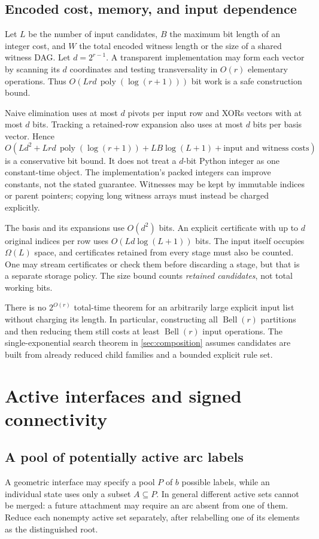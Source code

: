 \documentclass[11pt,a4paper]{article}
\theoremstyle{definition}
\theoremstyle{remark}
\newcommand{\Bell}{\operatorname{Bell}}
\newcommand{\poly}{\operatorname{poly}}
\begin{document}
\subsection{Encoded cost, memory, and input dependence}\label{sub:cost}
Let $L$ be the number of input candidates, $B$ the maximum bit length of an integer
cost, and $W$ the total encoded witness length or the size of a shared witness DAG.
Let $d=2^{r-1}$. A transparent implementation may form each vector by scanning its
$d$ coordinates and testing transversality in $O(r)$ elementary operations. Thus
$O(Lrd\,\poly(\log(r+1)))$ bit work is a safe construction bound.

Naive elimination uses at most $d$ pivots per input row and XORs vectors with at most
$d$ bits. Tracking a retained-row expansion also uses at most $d$ bits per basis
vector. Hence
\begin{equation}
 O\!\left(Ld^2+Lrd\,\poly(\log(r+1))
       +LB\log(L+1)+\text{input and witness costs}\right)
 \label{eq:kernel-cost}
\end{equation}
is a conservative bit bound. It does not treat a $d$-bit Python integer as one
constant-time object. The implementation's packed integers can improve constants,
not the stated guarantee. Witnesses may be kept by immutable indices or parent pointers;
copying long witness arrays must instead be charged explicitly.

The basis and its expansions use $O(d^2)$ bits. An explicit certificate with up to
$d$ original indices per row uses $O(Ld\log(L+1))$ bits. The input itself occupies
$\Omega(L)$ space, and certificates retained from every stage must also be counted.
One may stream certificates or check them before discarding a stage, but that is a
separate storage policy. The size bound counts \emph{retained candidates}, not total
working bits.

There is no $2^{O(r)}$ total-time theorem for an arbitrarily large explicit input list
without charging its length. In particular, constructing all $\Bell(r)$ partitions
and then reducing them still costs at least $\Bell(r)$ input operations. The
single-exponential search theorem in \cref{sec:composition} assumes candidates are
built from already reduced child families and a bounded explicit rule set.

\section{Active interfaces and signed connectivity}\label{sec:extensions}
\subsection{A pool of potentially active arc labels}
A geometric interface may specify a pool $P$ of $b$ possible labels, while an individual
state uses only a subset $A\subseteq P$. In general different active sets cannot be
merged: a future attachment may require an arc absent from one of them. Reduce each
nonempty active set separately, after relabelling one of its elements as the distinguished
root.
\end{document}
